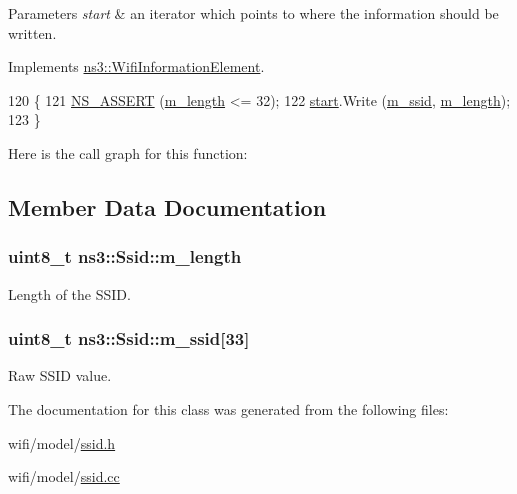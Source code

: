 \begin{DoxyParams}{Parameters}
{\em start} & an iterator which points to where the information should be written. \\
\hline
\end{DoxyParams}


Implements \hyperlink{classns3_1_1WifiInformationElement_aaa9fe963ad89df58b8980eb94ace2a7c}{ns3\+::\+Wifi\+Information\+Element}.


\begin{DoxyCode}
120 \{
121   \hyperlink{assert_8h_a6dccdb0de9b252f60088ce281c49d052}{NS\_ASSERT} (\hyperlink{classns3_1_1Ssid_a3ff2d6b73b1310abc0c879882c0cf87f}{m\_length} <= 32);
122   \hyperlink{namespacevisualizer_1_1core_a2a35e5d8a34af358b508dac8635754e0}{start}.Write (\hyperlink{classns3_1_1Ssid_aa37f5a67d0b20bdca50003ffcd044b88}{m\_ssid}, \hyperlink{classns3_1_1Ssid_a3ff2d6b73b1310abc0c879882c0cf87f}{m\_length});
123 \}
\end{DoxyCode}


Here is the call graph for this function\+:




\subsection{Member Data Documentation}
\subsubsection[{\texorpdfstring{m\+\_\+length}{m_length}}]{\setlength{\rightskip}{0pt plus 5cm}uint8\+\_\+t ns3\+::\+Ssid\+::m\+\_\+length\hspace{0.3cm}{\ttfamily [private]}}\hypertarget{classns3_1_1Ssid_a3ff2d6b73b1310abc0c879882c0cf87f}{}\label{classns3_1_1Ssid_a3ff2d6b73b1310abc0c879882c0cf87f}


Length of the S\+S\+ID. 

\subsubsection[{\texorpdfstring{m\+\_\+ssid}{m_ssid}}]{\setlength{\rightskip}{0pt plus 5cm}uint8\+\_\+t ns3\+::\+Ssid\+::m\+\_\+ssid\mbox{[}33\mbox{]}\hspace{0.3cm}{\ttfamily [private]}}\hypertarget{classns3_1_1Ssid_aa37f5a67d0b20bdca50003ffcd044b88}{}\label{classns3_1_1Ssid_aa37f5a67d0b20bdca50003ffcd044b88}


Raw S\+S\+ID value. 



The documentation for this class was generated from the following files\+:\begin{DoxyCompactItemize}
\item 
wifi/model/\hyperlink{ssid_8h}{ssid.\+h}\item 
wifi/model/\hyperlink{ssid_8cc}{ssid.\+cc}\end{DoxyCompactItemize}
